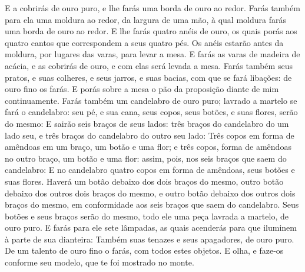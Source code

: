 {{  E a cobrirás de ouro puro, e lhe farás uma borda de ouro ao redor.
  Farás também para ela uma moldura ao redor, da largura de uma mão, à qual moldura farás uma borda de ouro ao redor. %
  E lhe farás quatro anéis de ouro, os quais porás aos quatro cantos que correspondem a seus quatro pés.
  Os anéis estarão antes da moldura, por lugares das varas, para levar a mesa.
  E farás as varas de madeira de acácia, e as cobrirás de ouro, e com elas será levada a mesa.
  Farás também seus pratos, e suas colheres, e seus jarros, e suas bacias, com que se fará libações: de ouro fino os farás.
  E porás sobre a mesa o pão da proposição diante de mim continuamente.
  Farás também um candelabro de ouro puro; lavrado a martelo se fará o candelabro: seu pé, e sua cana, seus copos, seus botões, e suas flores, serão do mesmo:
  E sairão seis braços de seus lados: três braços do candelabro do um lado seu, e três braços do candelabro do outro seu lado:
  Três copos em forma de amêndoas em um braço, um botão e uma flor; e três copos, forma de amêndoas no outro braço, um botão e uma flor: assim, pois, nos seis braços que saem do candelabro:
  E no candelabro quatro copos em forma de amêndoas, seus botões e suas flores.
  Haverá um botão debaixo dos dois braços do mesmo, outro botão debaixo dos outros dois braços do mesmo, e outro botão debaixo dos outros dois braços do mesmo, em conformidade aos seis braços que saem do candelabro. %
  Seus botões e seus braços serão do mesmo, todo ele uma peça lavrada a martelo, de ouro puro.
  E farás para ele sete lâmpadas, as quais acenderás para que iluminem à parte de sua dianteira:
  Também suas tenazes e seus apagadores, de ouro puro.
  De um talento de ouro fino o farás, com todos estes objetos.
  E olha, e faze-os conforme seu modelo, que te foi mostrado no monte}.
\par }

